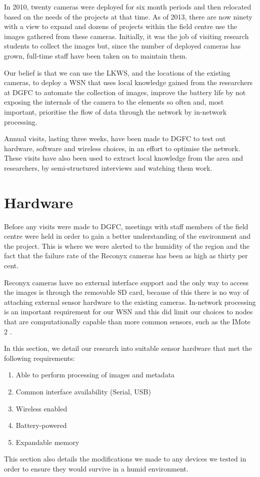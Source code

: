 In 2010, twenty cameras were deployed for six month periods and then relocated based on the needs of the projects at that time. As of 2013, there are now ninety with a view to expand and dozens of projects within the field centre use the images gathered from these cameras. Initially, it was the job of visiting research students to collect the images but, since the number of deployed cameras has grown, full-time staff have been taken on to maintain them.

Our belief is that we can use the LKWS, and the locations of the existing cameras, to deploy a WSN that uses local knowledge gained from the researchers at DGFC to automate the collection of images, improve the battery life by not exposing the internals of the camera to the elements so often and, most important, prioritise the flow of data through the network by in-network processing. 
	
Annual visits, lasting three weeks, have been made to DGFC to test out hardware, software and wireless choices, in an effort to optimise the network. These visits have also been used to extract local knowledge from the area and researchers, by semi-structured interviews and watching them work.

\section{Hardware}\label{tech:hw}
	Before any visits were made to DGFC, meetings with staff members of the field centre were held in order to gain a better understanding of the environment and the project. This is where we were alerted to the humidity of the region and the fact that the failure rate of the Reconyx cameras has been as high as thirty per cent.

Reconyx cameras have no external interface support and the only way to access the images is through the removable SD card, because of this there is no way of attaching external sensor hardware to the existing cameras. In-network processing is an important requirement for our WSN and this did limit our choices to nodes that are computationally capable than more common sensors, such as the IMote 2 \cite{Nachman2008}.

In this section, we detail our research into suitable sensor hardware that met the following requirements:
\begin{enumerate}
	\item Able to perform processing of images and metadata
	\item Common interface availability (Serial, USB)
	\item Wireless enabled
	\item Battery-powered
	\item Expandable memory
\end{enumerate}
This section also details the modifications we made to any devices we tested in order to ensure they would survive in a humid environment.

